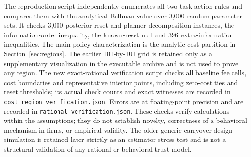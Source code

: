 The reproduction script independently enumerates all two-task action rules and compares them with the analytical Bellman value over 3,000 random parameter sets. It checks 3,000 posterior-reset and planner-decomposition instances, the information-order inequality, the known-reset null and 396 extra-information inequalities. The main policy characterization is the analytic cost partition in Section~\ref{sec:regions}. The earlier 101-by-101 grid is retained only as a supplementary visualization in the executable archive and is not used to prove any region. The new exact-rational verification script checks all baseline fee cells, cost boundaries and representative interior points, including zero-cost ties and reset thresholds; its actual check counts and exact witnesses are recorded in \texttt{cost\_region\_verification.json}. Errors are at floating-point precision and are recorded in \texttt{rational\_verification.json}. These checks verify calculations within the assumptions; they do not establish novelty, correctness of a behavioral mechanism in firms, or empirical validity. The older generic carryover design simulation is retained later strictly as an estimator stress test and is not a structural validation of any rational or behavioral trust model.
